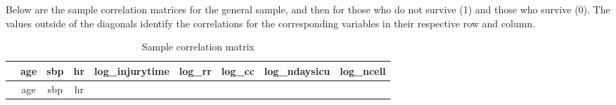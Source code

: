 \documentclass[
]{article}
\begin{document}
Below are the sample correlation matrices for the general sample, and
then for those who do not survive (1) and those who survive (0). The
values outside of the diagonals identify the correlations for the
corresponding variables in their respective row and column.

\begin{longtable}[]{@{}lcccccccc@{}}
\caption{Sample correlation matrix}\tabularnewline
\toprule
\begin{minipage}[b]{0.10\columnwidth}\raggedright
\strut
\end{minipage} & \begin{minipage}[b]{0.08\columnwidth}\centering
age\strut
\end{minipage} & \begin{minipage}[b]{0.08\columnwidth}\centering
sbp\strut
\end{minipage} & \begin{minipage}[b]{0.08\columnwidth}\centering
hr\strut
\end{minipage} & \begin{minipage}[b]{0.10\columnwidth}\centering
log\_injurytime\strut
\end{minipage} & \begin{minipage}[b]{0.08\columnwidth}\centering
log\_rr\strut
\end{minipage} & \begin{minipage}[b]{0.08\columnwidth}\centering
log\_cc\strut
\end{minipage} & \begin{minipage}[b]{0.09\columnwidth}\centering
log\_ndaysicu\strut
\end{minipage} & \begin{minipage}[b]{0.08\columnwidth}\centering
log\_ncell\strut
\end{minipage}\tabularnewline
\midrule
\endfirsthead
\toprule
\begin{minipage}[b]{0.10\columnwidth}\raggedright
\strut
\end{minipage} & \begin{minipage}[b]{0.08\columnwidth}\centering
age\strut
\end{minipage} & \begin{minipage}[b]{0.08\columnwidth}\centering
sbp\strut
\end{minipage} & \begin{minipage}[b]{0.08\columnwidth}\centering
hr\strut
\end{minipage} & \begin{minipage}[b]{0.10\columnwidth}\centering

\end{minipage}
\end{longtable}
\end{document}
